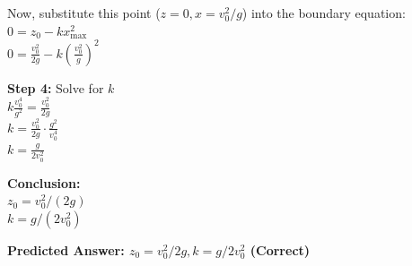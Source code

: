 \begin{minipage}{\linewidth}
\begin{tcolorbox}[
    title={IPhO 2012 Q1},
    colback=white,
    colframe=gray!50!black,
    arc=3pt,
    boxrule=1pt,
    fonttitle=\sffamily\large,
    width=\linewidth
]
\begin{minipage}[t]{0.49\linewidth}
\begin{tcolorbox}
            Now, substitute this point ($z=0, x = v_0^2/g$) into the boundary equation:\\
            $0 = z_0 - k x_{\max}^2$\\
            $0 = \frac{v_0^2}{2g} - k (\frac{v_0^2}{g})^2$
            \vspace{1em}
            
            \textbf{\textcolor{green!40!black}{Step 4:}} Solve for $k$\\
            $k \frac{v_0^4}{g^2} = \frac{v_0^2}{2g}$\\
            $k = \frac{v_0^2}{2g} \cdot \frac{g^2}{v_0^4}$\\
            $k = \frac{g}{2 v_0^2}$
            \vspace{1em}
            
            \textbf{Conclusion:}\\
            $z_0 = v_0^2 / (2g)$\\
            $k = g / (2 v_0^2)$
            \vspace{1em}
            
            \textbf{Predicted Answer: $z_0 = v_0^2/2g, k = g/2v_0^2$ (Correct)}
        \end{tcolorbox}
    \end{minipage}

\end{tcolorbox}
    \label{fig:ipho_2012_q1}
\end{minipage}